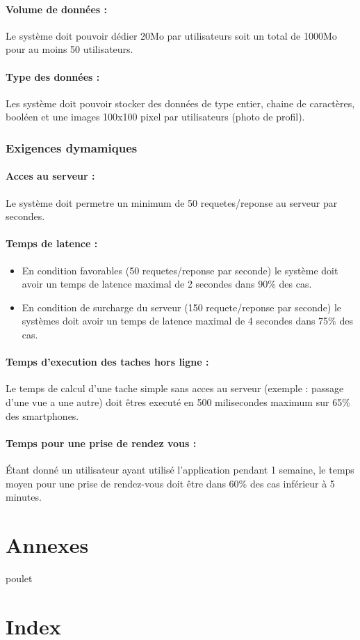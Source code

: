 \documentclass{article}
\begin{document}
\paragraph{Volume de données :}
Le système doit pouvoir dédier 20Mo par utilisateurs soit un total de
1000Mo pour au moins 50 utilisateurs.
\paragraph{Type des données :}
Les système doit pouvoir stocker des données de type entier, chaine de
caractères, booléen et une images 100x100 pixel par utilisateurs
(photo de profil).


\subsubsection{Exigences dymamiques}
\paragraph{Acces au serveur :}
Le système doit permetre un minimum de 50 requetes/reponse au serveur
par secondes.
\paragraph{Temps de latence :}
\begin{itemize}
\item En condition favorables (50 requetes/reponse par seconde) le
  système doit avoir un temps de latence maximal de 2 secondes dans
  90\% des cas.
\item En condition de surcharge du serveur (150 requete/reponse par
  seconde) le systèmes doit avoir un temps de latence maximal de 4
  secondes dans 75\% des cas.
\end{itemize}

\paragraph{Temps d'execution des taches hors ligne :}
Le temps de calcul d'une tache simple sans acces au serveur (exemple : passage d'une vue a
une autre) doit êtres executé en 500 milisecondes maximum sur 65\% des
smartphones.

\paragraph{Temps pour une prise de rendez vous :}
Étant donné un utilisateur ayant utilisé l'application pendant 1
semaine, le temps moyen pour une prise de rendez-vous doit être dans
60\% des cas inférieur à 5 minutes.



\section{Annexes}
poulet
\section{Index}
\end{document}
